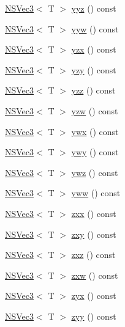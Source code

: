 \begin{DoxyCompactItemize}
\item 
\hyperlink{structNSVec3}{N\-S\-Vec3}$<$ T $>$ \hyperlink{structNSVec4_aa64db7f6329f41272757e259ffcc6805}{yyz} () const 
\item 
\hyperlink{structNSVec3}{N\-S\-Vec3}$<$ T $>$ \hyperlink{structNSVec4_a05abdf063f8fc08e8cca13f2e5de0abd}{yyw} () const 
\item 
\hyperlink{structNSVec3}{N\-S\-Vec3}$<$ T $>$ \hyperlink{structNSVec4_a900969ede3a0d97b58cad8b869c6c2e2}{yzx} () const 
\item 
\hyperlink{structNSVec3}{N\-S\-Vec3}$<$ T $>$ \hyperlink{structNSVec4_ac1dc3e128bd56c7816b31cffebcc7f69}{yzy} () const 
\item 
\hyperlink{structNSVec3}{N\-S\-Vec3}$<$ T $>$ \hyperlink{structNSVec4_a858cfd499c3cfb563d97e477729573e5}{yzz} () const 
\item 
\hyperlink{structNSVec3}{N\-S\-Vec3}$<$ T $>$ \hyperlink{structNSVec4_a06d459bf5ab6a486f902a39676f5c087}{yzw} () const 
\item 
\hyperlink{structNSVec3}{N\-S\-Vec3}$<$ T $>$ \hyperlink{structNSVec4_a77ee22603ffac206b4f27abfb84b2534}{ywx} () const 
\item 
\hyperlink{structNSVec3}{N\-S\-Vec3}$<$ T $>$ \hyperlink{structNSVec4_ada51a38ee129c126869d4f71ce73d9fc}{ywy} () const 
\item 
\hyperlink{structNSVec3}{N\-S\-Vec3}$<$ T $>$ \hyperlink{structNSVec4_a52962f6b7a436849567563d84348834f}{ywz} () const 
\item 
\hyperlink{structNSVec3}{N\-S\-Vec3}$<$ T $>$ \hyperlink{structNSVec4_a5dc3537ef673df80843b8625236d5281}{yww} () const 
\item 
\hyperlink{structNSVec3}{N\-S\-Vec3}$<$ T $>$ \hyperlink{structNSVec4_a5b7df7f7ce507340a810a3811c1f04c0}{zxx} () const 
\item 
\hyperlink{structNSVec3}{N\-S\-Vec3}$<$ T $>$ \hyperlink{structNSVec4_a8aa6b7c30f12d109399a01f8fd159fb5}{zxy} () const 
\item 
\hyperlink{structNSVec3}{N\-S\-Vec3}$<$ T $>$ \hyperlink{structNSVec4_a9b3ed3c1fcfa4811e085d654098df5c1}{zxz} () const 
\item 
\hyperlink{structNSVec3}{N\-S\-Vec3}$<$ T $>$ \hyperlink{structNSVec4_ae7709d658447f9327e702d1cabf2b07b}{zxw} () const 
\item 
\hyperlink{structNSVec3}{N\-S\-Vec3}$<$ T $>$ \hyperlink{structNSVec4_ab1fefab4ce57d82fc95979a557783b18}{zyx} () const 
\item 
\hyperlink{structNSVec3}{N\-S\-Vec3}$<$ T $>$ \hyperlink{structNSVec4_a04b4437e313f788e2b9900afdae1d6a5}{zyy} () const 

\end{DoxyCompactItemize}
